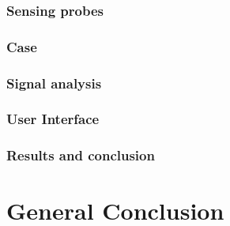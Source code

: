 \documentclass[conference]{IEEEtran}
\begin{document}
      \subsubsection{Sensing probes}
      \subsubsection{Case}
      \subsubsection{Signal analysis}
      \subsubsection{User Interface}
      \subsubsection{Results and conclusion}
\section{General Conclusion} %







\end{document}

